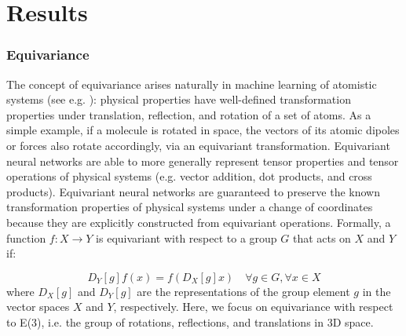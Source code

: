 \documentclass[%
reprint,
superscriptaddress,
nofootinbib,
amsmath,amssymb,
aps,
prl,
]{revtex4-1}
\begin{document}
\section{Results}

\subsubsection{Equivariance}
The concept of equivariance arises naturally in machine learning of atomistic systems (see e.g. \cite{grisafi2019atomic}): physical properties have well-defined transformation properties under translation, reflection, and rotation of a set of atoms. As a simple example, if a molecule is rotated in space, the vectors of its atomic dipoles or forces also rotate accordingly, via an equivariant transformation. Equivariant neural networks are able to more generally represent tensor properties and tensor operations of physical systems (e.g. vector addition, dot products, and cross products). Equivariant neural networks are guaranteed to preserve the known transformation properties of physical systems under a change of coordinates because they are explicitly constructed from equivariant operations. Formally, a function $f: X \rightarrow Y$ is equivariant with respect to a group $G$ that acts on $X$ and $Y$ if: 

\begin{equation}
    D_Y[g] f(x) = f (D_X[g] x) \quad \forall g \in G, \forall x \in X
\end{equation}
where $D_X[g]$ and $D_Y[g]$ are the representations of the group element $g$ in the vector spaces $X$ and $Y$, respectively. Here, we focus on equivariance with respect to E(3), i.e. the group of rotations, reflections, and translations in 3D space.
\end{document}
